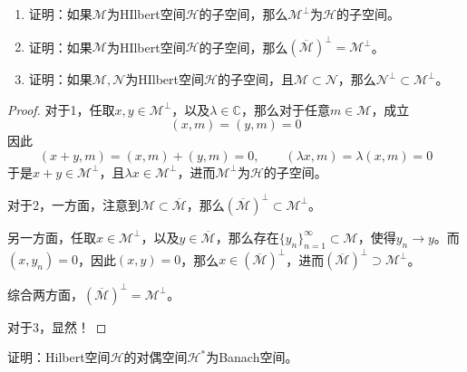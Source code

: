 \documentclass[lang = cn, scheme = chinese, 10pt]{elegantbook}
\newcommand{\C}{\mathbb{C}}  %
\newcommand{\sub}{\subset}   %
\begin{document}
\begin{proposition}
	\begin{enumerate}
		\item 证明：如果$\mathcal{M}$为HIlbert空间$\mathcal{H}$的子空间，那么$\mathcal{M}^\perp$为$\mathcal{H}$的子空间。
		\item 证明：如果$\mathcal{M}$为HIlbert空间$\mathcal{H}$的子空间，那么$(\overline{\mathcal{M}})^\perp=\mathcal{M}^\perp$。
		\item 证明：如果$\mathcal{M}, \mathcal{N} $为HIlbert空间$\mathcal{H}$的子空间，且$\mathcal{M}\sub \mathcal{N} $，那么$ \mathcal{N} ^\perp\sub \mathcal{M}^\perp$。
	\end{enumerate}
\end{proposition}

\begin{proof}
	对于1，任取$x,y\in\mathcal{M}^\perp$，以及$\lambda\in\C$，那么对于任意$m\in \mathcal{M}$，成立
	$$
	(x,m)=(y,m)=0
	$$
	因此
	$$
	(x+y,m)=(x,m)+(y,m)=0,\qquad
	(\lambda x,m)=\lambda(x,m)=0
	$$
	于是$x+y\in \mathcal{M}^\perp$，且$\lambda x\in \mathcal{M}^\perp$，进而$\mathcal{M}^\perp$为$\mathcal{H}$的子空间。
	
	对于2，一方面，注意到$\mathcal{M}\sub\overline{\mathcal{M}}$，那么$(\overline{\mathcal{M}})^\perp\sub\mathcal{M}^\perp$。
	
	另一方面，任取$x\in \mathcal{M}^\perp$，以及$y\in \overline{\mathcal{M}}$，那么存在$\{y_n\}_{n=1}^{\infty}\sub\mathcal{M}$，使得$y_n\to y$。而$(x,y_n)=0$，因此$(x,y)=0$，那么$x\in (\overline{\mathcal{M}})^\perp$，进而$(\overline{\mathcal{M}})^\perp\supset\mathcal{M}^\perp$。
	
	综合两方面，$(\overline{\mathcal{M}})^\perp=\mathcal{M}^\perp$。
	
	对于3，显然！
\end{proof}

\begin{proposition}
	证明：Hilbert空间$\mathcal{H}$的对偶空间$\mathcal{H}^*$为Banach空间。
\end{proposition}
\end{document}
